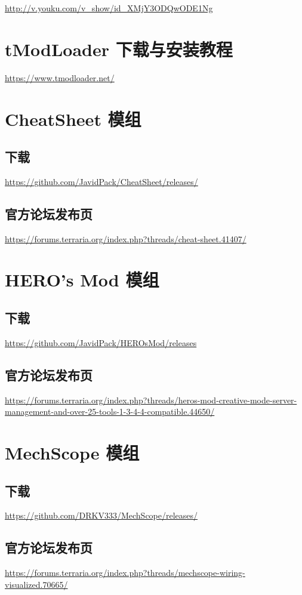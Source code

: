 \url{http://v.youku.com/v_show/id_XMjY3ODQwODE1Ng}

\section{tModLoader 下载与安装教程}\label{app4}
\url{https://www.tmodloader.net/}

\section{CheatSheet 模组}\label{app5}
\subsection*{下载}
\url{https://github.com/JavidPack/CheatSheet/releases/}
\subsection*{官方论坛发布页}
\url{https://forums.terraria.org/index.php?threads/cheat-sheet.41407/}

\section{HERO's Mod 模组}\label{app6}
\subsection*{下载}
\url{https://github.com/JavidPack/HEROsMod/releases}
\subsection*{官方论坛发布页}
\url{https://forums.terraria.org/index.php?threads/heros-mod-creative-mode-server-management-and-over-25-tools-1-3-4-4-compatible.44650/}

\section{MechScope 模组}\label{app7}
\subsection*{下载}
\url{https://github.com/DRKV333/MechScope/releases/}
\subsection*{官方论坛发布页}
\url{https://forums.terraria.org/index.php?threads/mechscope-wiring-visualized.70665/}

